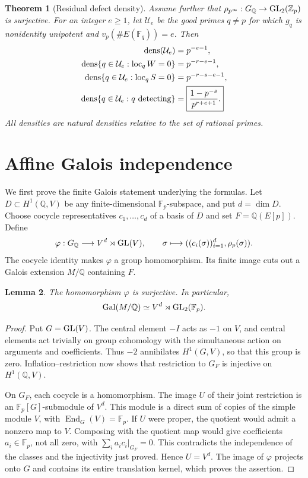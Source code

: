 \documentclass[11pt]{article}
\newtheorem{theorem}{Theorem}[section]
\newtheorem{lemma}[theorem]{Lemma}
\theoremstyle{remark}\newtheorem{remark}[theorem]{Remark}
\newcommand{\Q}{\mathbb Q}\newcommand{\F}{\mathbb F}\newcommand{\Z}{\mathbb Z}
\begin{document}
\begin{theorem}[Residual defect density]\label{main}
Assume further that $\rho_{p^\infty}:G_{\Q}\to\GL_2(\Z_p)$ is surjective. For an integer $e\geq1$, let $\mathcal U_e$ be the good primes $q\ne p$ for which $g_q$ is nonidentity unipotent and $v_p(\#E(\F_q))=e$. Then
\begin{align}
 \operatorname{dens}(\mathcal U_e)&=p^{-e-1},\\
 \operatorname{dens}\{q\in\mathcal U_e:\operatorname{loc}_q W=0\}&=p^{-r-e-1},\\
 \operatorname{dens}\{q\in\mathcal U_e:\operatorname{loc}_q S=0\}&=p^{-r-s-e-1},\\
 \operatorname{dens}\{q\in\mathcal U_e:q\text{ detecting}\}
 &=\boxed{\dfrac{1-p^{-s}}{p^{r+e+1}}.}\label{density}
\end{align}
All densities are natural densities relative to the set of rational primes.
\end{theorem}

\section{Affine Galois independence}
We first prove the finite Galois statement underlying the formulas. Let $D\subset H^1(\Q,V)$ be any finite-dimensional $\F_p$-subspace, and put $d=\dim D$. Choose cocycle representatives $c_1,\ldots,c_d$ of a basis of $D$ and set $F=\Q(E[p])$. Define
\[
 \varphi:G_{\Q}\longrightarrow V^d\rtimes\GL(V),\qquad
 \sigma\longmapsto ((c_i(\sigma))_{i=1}^d,\rho_p(\sigma)).
\]
The cocycle identity makes $\varphi$ a group homomorphism. Its finite image cuts out a Galois extension $M/\Q$ containing $F$.

\begin{lemma}\label{affine}
The homomorphism $\varphi$ is surjective. In particular,
\[
 \Gal(M/\Q)\simeq V^d\rtimes\GL_2(\F_p).
\]
\end{lemma}
\begin{proof}
Put $G=\operatorname{GL}(V)$. The central element $-I$ acts as $-1$ on $V$, and central elements act trivially on group cohomology with the simultaneous action on arguments and coefficients. Thus $-2$ annihilates $H^1(G,V)$, so that this group is zero. Inflation--restriction now shows that restriction to $G_F$ is injective on $H^1(\Q,V)$.

On $G_F$, each cocycle is a homomorphism. The image $U$ of their joint restriction is an $\F_p[G]$-submodule of $V^d$. This module is a direct sum of copies of the simple module $V$, with $\operatorname{End}_G(V)=\F_p$. If $U$ were proper, the quotient would admit a nonzero map to $V$. Composing with the quotient map would give coefficients $a_i\in\F_p$, not all zero, with $\sum_i a_ic_i|_{G_F}=0$. This contradicts the independence of the classes and the injectivity just proved. Hence $U=V^d$. The image of $\varphi$ projects onto $G$ and contains its entire translation kernel, which proves the assertion.
\end{proof}
\end{document}
